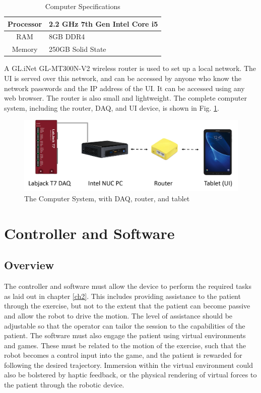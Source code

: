 \documentclass[12pt]{report}
\begin{document}
	
	\begin{table}[h]
	\centering
	\caption{Computer Specifications}	
	\begin{tabular}{|c|l|}
		\hline
		Processor & 2.2 GHz 7th Gen Intel Core i5 \\ \hline
		RAM & 8GB DDR4 \\ \hline
		Memory & 250GB Solid State \\ \hline
		\end{tabular}
	\label{tab:comp}
	\end{table}
	
	 
	A GL.iNet GL-MT300N-V2 wireless router is used to set up a local network. The UI is served over this network, and can be accessed by anyone who know the network passwords and the IP address of the UI. It can be accessed using any web browser. The router is also small and lightweight. The complete computer system, including the router, DAQ, and UI device, is shown in Fig. \ref{fig:comp}. 
	


	\begin{figure}[h] 
		\centering
		\includegraphics[width=\linewidth]{computer_system}
		\caption{The Computer System, with DAQ, router, and tablet}
		\label{fig:comp}
	\end{figure}
	
	
		
\chapter{Controller and Software} \label{ch3}


	\section{Overview}
	
	The controller and software must allow the device to perform the required tasks as laid out in chapter \ref{ch2}. This includes providing assistance to the patient through the exercise, but not to the extent that the patient can become passive and allow the robot to drive the motion. The level of assistance should be adjustable so that the operator can tailor the session to the capabilities of the patient. The software must also engage the patient using virtual environments and games. These must be related to the motion of the exercise, such that the robot becomes a control input into the game, and the patient is rewarded for following the desired trajectory. Immersion within the virtual environment could also be bolstered by haptic feedback, or the physical rendering of virtual forces to the patient through the robotic device. 
	
\end{document}
